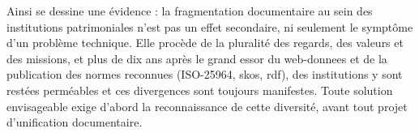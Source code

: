 \bigskip
\bigskip
\bigskip


Ainsi se dessine une évidence : la fragmentation documentaire au sein des institutions patrimoniales n’est pas un effet secondaire, ni seulement le symptôme d’un problème technique. Elle procède de la pluralité des regards, des valeurs et des missions, et plus de dix ans après le grand essor du \gls{web-donnees} et de la publication des normes reconnues (ISO-25964, \gls{skos}, \gls{rdf}), des institutions y sont restées perméables et ces divergences sont toujours manifestes. Toute solution envisageable exige d’abord la reconnaissance de cette diversité, avant tout projet d’unification documentaire.